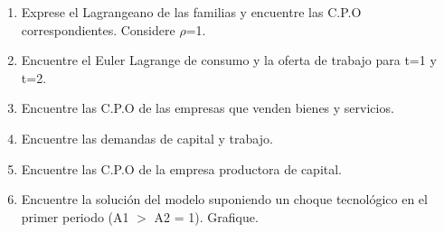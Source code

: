 \documentclass[a4paper,12pt]{article}
\begin{document}
\begin{enumerate}
\begin{enumerate}[label=\alph*)]
    \item Exprese el Lagrangeano de las familias y encuentre las C.P.O correspondientes. Considere $\rho$=1.
    \item Encuentre el Euler Lagrange de consumo y la oferta de trabajo para t=1 y t=2.
    \item Encuentre las C.P.O de las empresas que venden bienes y servicios.
    \item Encuentre las demandas de capital y trabajo.
    \item Encuentre las C.P.O de la empresa productora de capital.
   \item Encuentre la solución del modelo suponiendo un choque tecnológico en el primer periodo
(A1 $>$ A2 = 1). Grafique.
\end{enumerate}

\end{enumerate}
\end{document}
